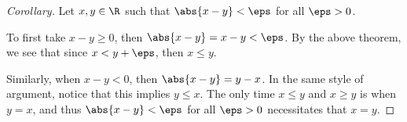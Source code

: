 \documentclass{article}
\begin{document}
\begin{enumerate}
        \begin{proof}[Corollary]
          Let $x, y \in \R$ such that $\abs{x - y} < \eps$ for all $\eps > 0$.

          To first take $x - y \ge 0$, then $\abs{x - y} = x - y < \eps$. By the above theorem,
          we see that since $x < y + \eps$, then $x \le y$.

          Similarly, when $x - y < 0$, then $\abs{x - y} = y - x$. In the same style of argument,
          notice that this implies $y \le x$. The only time $x \le y$ and $x \ge y$ is when $y = x$,
          and thus $\abs{x - y} < \eps$ for all $\eps > 0$ necessitates that $x = y$.
        \end{proof}
\end{enumerate}
\end{document}
